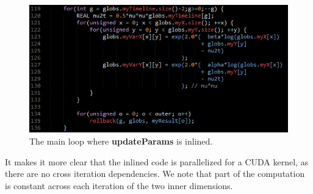 \begin{figure}[!ht]
	\centering
		\includegraphics[scale=0.75]{input/figures/inline_updateparams.png}
		\caption{The main loop where \textbf{updateParams} is inlined.\label{fig:inline_updateparams}}
\end{figure}

It makes it more clear that the inlined
code is parallelized for a CUDA kernel, as there are no cross iteration
dependencies. We note that part of the computation is constant across each
iteration of the two inner dimensions.